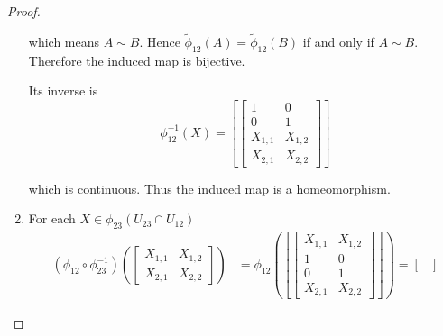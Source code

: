 \begin{proof}
\begin{enumerate}[label={(\alph*)},leftmargin=*]
              which means \( A \sim B \). Hence \( \tilde{\phi}_{12}(A) = \tilde{\phi}_{12}(B) \) if and only if \( A \sim B \). Therefore the induced map is bijective.

              Its inverse is
              \[
                  \phi_{12}^{-1}(X) = \left[\begin{bmatrix}
                          1       & 0       \\
                          0       & 1       \\
                          X_{1,1} & X_{1,2} \\
                          X_{2,1} & X_{2,2}
                      \end{bmatrix}\right]
              \]

              which is continuous. Thus the induced map is a homeomorphism.
        \item For each \( X \in \phi_{23}(U_{23} \cap U_{12}) \)
              \begingroup
              \allowdisplaybreaks%
              \begin{align*}
                  (\phi_{12} \circ \phi_{23}^{-1})\left( \begin{bmatrix} X_{1,1} & X_{1,2} \\ X_{2,1} & X_{2,2} \end{bmatrix} \right) & = \phi_{12}\left(\left[\begin{bmatrix}
                                                                                                                                                                       X_{1,1} & X_{1,2} \\
                                                                                                                                                                       1       & 0       \\
                                                                                                                                                                       0       & 1       \\
                                                                                                                                                                       X_{2,1} & X_{2,2}
                                                                                                                                                                   \end{bmatrix}\right]\right) = \begin{bmatrix}

\end{bmatrix}
\end{align*}
\end{enumerate}
\end{proof}
